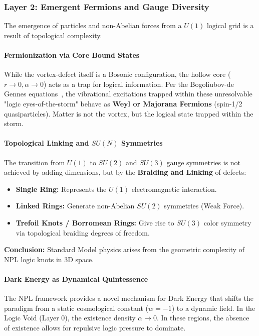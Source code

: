 \documentclass[a4paper,12pt]{article}
\begin{document}
\subsubsection{Layer 2: Emergent Fermions and Gauge Diversity}
The emergence of particles and non-Abelian forces from a $U(1)$ logical grid is a result of topological complexity.

\paragraph{Fermionization via Core Bound States}
While the vortex-defect itself is a Bosonic configuration, the hollow core ($r \to 0, \alpha \to 0$) acts as a trap for logical information. Per the Bogoliubov-de Gennes equations~\cite{cdgm1964}, the vibrational excitations trapped within these unresolvable "logic eyes-of-the-storm" behave as \textbf{Weyl or Majorana Fermions} (spin-1/2 quasiparticles). Matter is not the vortex, but the logical state trapped within the storm.

\paragraph{Topological Linking and $SU(N)$ Symmetries}
The transition from $U(1)$ to $SU(2)$ and $SU(3)$ gauge symmetries is not achieved by adding dimensions, but by the \textbf{Braiding and Linking} of defects:
\begin{itemize}
    \item \textbf{Single Ring:} Represents the $U(1)$ electromagnetic interaction.
    \item \textbf{Linked Rings:} Generate non-Abelian $SU(2)$ symmetries (Weak Force).
    \item \textbf{Trefoil Knots / Borromean Rings:} Give rise to $SU(3)$ color symmetry via topological braiding degrees of freedom.
\end{itemize}
\textbf{Conclusion:} Standard Model physics arises from the geometric complexity of NPL logic knots in 3D space.

\paragraph{Dark Energy as Dynamical Quintessence}
The NPL framework provides a novel mechanism for Dark Energy that shifts the paradigm from a static cosmological constant ($w=-1$) to a dynamic field. In the Logic Void (Layer 0), the existence density $\alpha \to 0$. In these regions, the absence of existence allows for repulsive logic pressure to dominate.
\end{document}

